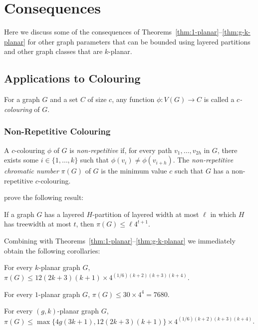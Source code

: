 \documentclass{patmorin}
\begin{document}
\section{Consequences}

Here we discuss some of the consequences of Theorems~\ref{thm:1-planar}--\ref{thm:g-k-planar} for other graph parameters that can be bounded using layered partitions and other graph classes that are $k$-planar.

\subsection{Applications to Colouring}

For a graph $G$ and a set $C$ of size $c$, any function $\phi\colon V(G)\to C$  is called a \emph{$c$-colouring} of $G$.  

\subsubsection{Non-Repetitive Colouring}

A $c$-colouring $\phi$ of $G$ is \emph{non-repetitive} if, for every path $v_1,\ldots,v_{2h}$ in $G$, there exists some $i\in\{1,\ldots,k\}$ such that $\phi(v_i)\neq\phi(v_{i+h})$.  The \emph{non-repetitive chromatic number} $\pi(G)$ of $G$ is the minimum value $c$ such that $G$ has a non-repetitive $c$-colouring.

\citet[Corollaries~9 and 10]{dujmovic.esperet.ea:planar} prove the following result:

\begin{lem}
  If a graph $G$ has a layered $H$-partition of layered width at most $\ell$ in which $H$ has treewidth at most $t$, then $\pi(G)\le \ell 4^{t+1}$.
\end{lem}

Combining  with Theorems~\ref{thm:1-planar}--\ref{thm:g-k-planar} we immediately obtain the following corollaries:

\begin{cor}
  For every $k$-planar graph $G$, $\pi(G)\le 12(2k+3)(k+1)\times 4^{(1/6)(k+2)(k+3)(k+4)}$.
\end{cor}

\begin{cor}
  For every $1$-planar graph $G$, $\pi(G)\le 30\times 4^4=7680$. 
\end{cor}

\begin{cor}
  For every $(g,k)$-planar graph $G$, $\pi(G)\le \max\{4g(3k+1),12(2k+3)(k+1)\}\times 4^{(1/6)(k+2)(k+3)(k+4)}$.
\end{cor}
\end{document}
